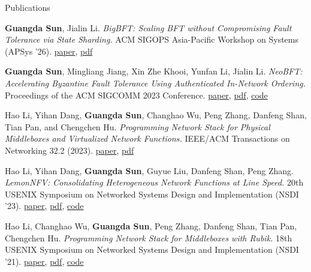 \documentclass[
]{resume} %
\begin{document}
\begin{rSection}{Publications}
\begin{enumerate}[label={[}\arabic*{]}]

\item
    \textbf{Guangda Sun}, Jialin Li.
    \textit{BigBFT: Scaling BFT without Compromising Fault Tolerance via State Sharding.}
    ACM SIGOPS Asia-Pacific Workshop on Systems (APSys '26).
    \href{https://doi.org/10.1145/3838177.3841729}{paper},
    \href{https://github.com/sgdxbc/sgdxbc/blob/main/papers/bigbft_apsys26.pdf}{pdf}

\item
    \textbf{Guangda Sun}, Mingliang Jiang, Xin Zhe Khooi, Yunfan Li, Jialin Li.
    \textit{NeoBFT: Accelerating Byzantine Fault Tolerance Using Authenticated In-Network Ordering.}
    Proceedings of the ACM SIGCOMM 2023 Conference.
    \href{https://doi.org/10.1145/3603269.3604874}{paper},
    \href{https://github.com/sgdxbc/sgdxbc/blob/main/papers/3603269.3604874.pdf}{pdf},
    \href{https://github.com/nus-sys/neobft-artifact}{code}


\item
    Hao Li, Yihan Dang, \textbf{Guangda Sun}, Changhao Wu, Peng Zhang, Danfeng Shan, Tian Pan, and Chengchen Hu.
    \textit{Programming Network Stack for Physical Middleboxes and Virtualized Network Functions.}
    IEEE/ACM Transactions on Networking 32.2 (2023).
    \href{https://ieeexplore.ieee.org/document/10273850}{paper},
    \href{https://github.com/sgdxbc/sgdxbc/blob/main/papers/TNET.2023.3307641.pdf}{pdf}

\item
    Hao Li, Yihan Dang, \textbf{Guangda Sun}, Guyue Liu, Danfeng Shan, Peng Zhang.
    \textit{LemonNFV: Consolidating Heterogeneous Network Functions at Line Speed.}
    20th USENIX Symposium on Networked Systems Design and Implementation (NSDI '23).
    \href{https://www.usenix.org/conference/nsdi23/presentation/li-hao}{paper},
    \href{https://github.com/sgdxbc/sgdxbc/blob/main/papers/nsdi23-li-hao.pdf}{pdf},
    \href{https://github.com/ants-xjtu/neptune}{code}

\item
    Hao Li, Changhao Wu, \textbf{Guangda Sun}, Peng Zhang, Danfeng Shan, Tian Pan, Chengchen Hu.
    \textit{Programming Network Stack for Middleboxes with Rubik.}
    18th USENIX Symposium on Networked Systems Design and Implementation (NSDI '21).
    \href{https://www.usenix.org/conference/nsdi21/presentation/li}{paper},
    \href{https://github.com/sgdxbc/sgdxbc/blob/main/papers/nsdi21-li.pdf}{pdf},
    \href{https://github.com/ants-xjtu/rubik}{code}


\end{enumerate}
\end{rSection}
\end{document}
